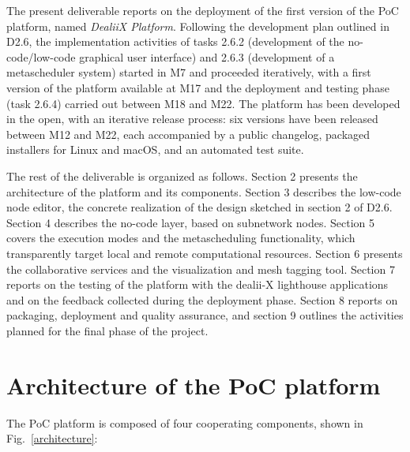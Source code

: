 \documentclass[a4paper,12pt]{article}
\begin{document}
The present deliverable reports on the deployment of the first version of
the PoC platform, named \emph{DealiiX Platform}. Following the development
plan outlined in D2.6, the implementation activities of tasks 2.6.2
(development of the no-code/low-code graphical user interface) and 2.6.3
(development of a metascheduler system) started in M7 and proceeded
iteratively, with a first version of the platform available at M17 and the
deployment and testing phase (task 2.6.4) carried out between M18 and M22.
The platform has been developed in the open, with an iterative release
process: six versions have been released between M12 and M22, each
accompanied by a public changelog, packaged installers for Linux and macOS,
and an automated test suite.

The rest of the deliverable is organized as follows. Section 2 presents the
architecture of the platform and its components. Section 3 describes the
low-code node editor, the concrete realization of the design sketched in
section 2 of D2.6. Section 4 describes the no-code layer, based on
subnetwork nodes. Section 5 covers the execution modes and the
metascheduling functionality, which transparently target local and remote
computational resources. Section 6 presents the collaborative services and
the visualization and mesh tagging tool. Section 7 reports on the testing of
the platform with the dealii-X lighthouse applications and on the feedback
collected during the deployment phase. Section 8 reports on packaging, deployment and
quality assurance, and section 9 outlines the activities planned for the
final phase of the project.

\section{\textcolor{EUblue}{Architecture of the PoC platform}}

The PoC platform is composed of four cooperating components, shown in
Fig.~\ref{architecture}:
\end{document}
